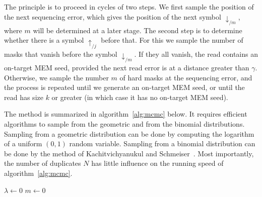 \documentclass{article}
\begin{document}
The principle is to proceed in cycles of two steps. We first sample the
position of the next sequencing error, which gives the position of the
next symbol $\downarrow_{/m}$, where $m$ will be determined at a later
stage. The second step is to determine whether there is a symbol
$\uparrow_{/j}$ before that. For this we sample the number of masks that
vanish before the symbol $\downarrow_{/m}$. If they all vanish, the read
contains an on-target MEM seed, provided the next read error is at a
distance greater than $\gamma$. Otherwise, we sample the number $m$ of
hard masks at the sequencing error, and the process is repeated until we
generate an on-target MEM seed, or until the read has size $k$ or greater
(in which case it has no on-target MEM seed).

The method is summarized in algorithm~\ref{alg:mcmc} below. It requires
efficient algorithms to sample from the geometric and from the binomial
distributions. Sampling from a geometric distribution can be done by
computing the logarithm of a uniform $(0,1)$ random variable. Sampling
from a binomial distribution can be done by the method of
Kachitvichyanukul and Schmeiser~\cite{kachitvichyanukul1988binomial}.
Most importantly, the number of duplicates $N$ has little influence on
the running speed of algorithm~\ref{alg:mcmc}.

\begin{algorithm}[H]
\label{alg:mcmc}
\SetAlgoLined
{}
  $\lambda \leftarrow 0$ 
  $m \leftarrow 0$ 
\end{algorithm}
\end{document}
